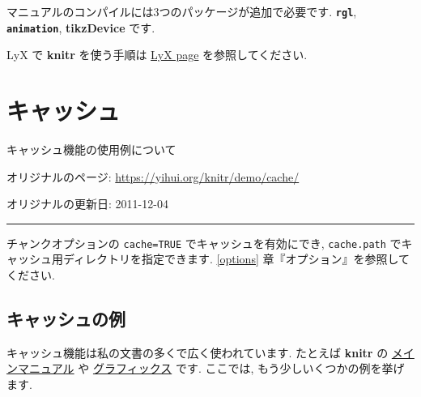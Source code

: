 \documentclass[
  xelatex,ja=standard,jafont=noto]{bxjsreport}
\begin{document}
マニュアルのコンパイルには3つのパッケージが追加で必要です.
\textbf{\texttt{rgl}}, \textbf{\texttt{animation}}, \textbf{tikzDevice}
です.

LyX で \textbf{knitr} を使う手順は
\href{https://yihui.org/knitr/demo/lyx/}{LyX page} を参照してください.

\hypertarget{cache}{%
\chapter*{キャッシュ}\label{cache}}

キャッシュ機能の使用例について

オリジナルのページ: \url{https://yihui.org/knitr/demo/cache/}

オリジナルの更新日: 2011-12-04

\begin{center}\rule{0.5\linewidth}{0.5pt}\end{center}

チャンクオプションの \texttt{cache=TRUE} でキャッシュを有効にでき,
\texttt{cache.path} でキャッシュ用ディレクトリを指定できます.
\ref{options} 章『オプション』を参照してください.

\hypertarget{ux30adux30e3ux30c3ux30b7ux30e5ux306eux4f8b}{%
\section*{キャッシュの例}\label{ux30adux30e3ux30c3ux30b7ux30e5ux306eux4f8b}}

キャッシュ機能は私の文書の多くで広く使われています. たとえば
\textbf{knitr} の \protect\hyperlink{manual}{メインマニュアル} や
\protect\hyperlink{graphics}{グラフィックス} です. ここでは,
もう少しいくつかの例を挙げます.
\end{document}
